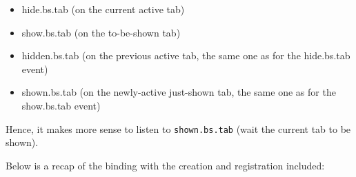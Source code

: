 \documentclass[
]{book}
\newenvironment{Shaded}{\begin{snugshade}}{\end{snugshade}}
\newcommand{\AttributeTok}[1]{\textcolor[rgb]{0.77,0.63,0.00}{#1}}
\newcommand{\CommentTok}[1]{\textcolor[rgb]{0.56,0.35,0.01}{\textit{#1}}}
\newcommand{\KeywordTok}[1]{\textcolor[rgb]{0.13,0.29,0.53}{\textbf{#1}}}
\newcommand{\NormalTok}[1]{#1}
\newcommand{\OperatorTok}[1]{\textcolor[rgb]{0.81,0.36,0.00}{\textbf{#1}}}
\newcommand{\StringTok}[1]{\textcolor[rgb]{0.31,0.60,0.02}{#1}}
\providecommand{\tightlist}{%
  \setlength{\itemsep}{0pt}\setlength{\parskip}{0pt}}
\begin{document}
\begin{itemize}
\tightlist
\item
  hide.bs.tab (on the current active tab)
\item
  show.bs.tab (on the to-be-shown tab)
\item
  hidden.bs.tab (on the previous active tab, the same one as for the hide.bs.tab event)
\item
  shown.bs.tab (on the newly-active just-shown tab, the same one as for the show.bs.tab event)
\end{itemize}

Hence, it makes more sense to listen to \texttt{shown.bs.tab} (wait the current tab to be shown).

\begin{Shaded}
\end{Shaded}

Below is a recap of the binding with the creation and registration included:
\end{document}
